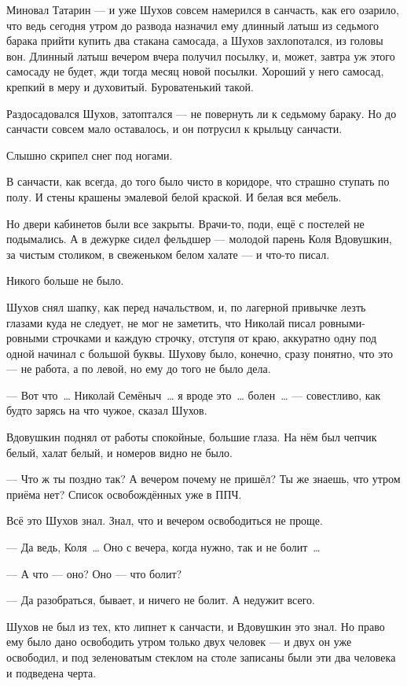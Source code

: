 Миновал Татарин --- и уже Шухов совсем намерился в санчасть, как его озарило, что ведь сегодня 
утром до развода назначил ему длинный латыш из седьмого барака прийти купить два стакана 
самосада, а Шухов захлопотался, из головы вон. Длинный латыш вечером вчера получил посылку, 
и, может, завтра уж этого самосаду не будет, жди тогда месяц новой посылки. Хороший у него 
самосад, крепкий в меру и духовитый. Буроватенький такой.

Раздосадовался Шухов, затоптался --- не повернуть ли к седьмому бараку. Но до санчасти совсем 
мало оставалось, и он потрусил к крыльцу санчасти.

Слышно скрипел снег под ногами.

В санчасти, как всегда, до того было чисто в коридоре, что страшно ступать по полу. И стены 
крашены эмалевой белой краской. И белая вся мебель.

Но двери кабинетов были все закрыты. Врачи-то, поди, ещё с постелей не подымались. А в дежурке 
сидел фельдшер --- молодой парень Коля Вдовушкин, за чистым столиком, в свеженьком белом 
халате --- и что-то писал.

Никого больше не было.

Шухов снял шапку, как перед начальством, и, по лагерной привычке лезть глазами куда не 
следует, не мог не заметить, что Николай писал ровными-ровными строчками и каждую строчку, 
отступя от краю, аккуратно одну под одной начинал с большой буквы. Шухову было, конечно, 
сразу понятно, что это --- не работа, а по левой, но ему до того не было дела.

--- Вот что~\dots{} Николай Семёныч~\dots{} я вроде это~\dots{} болен~\dots{} --- совестливо, как будто зарясь 
на что чужое, сказал Шухов.

Вдовушкин поднял от работы спокойные, большие глаза. На нём был чепчик белый, халат белый, и 
номеров видно не было.

--- Что ж ты поздно так? А вечером почему не пришёл? Ты же знаешь, что утром приёма нет? Список 
освобождённых уже в ППЧ.

Всё это Шухов знал. Знал, что и вечером освободиться не проще.

--- Да ведь, Коля~\dots{} Оно с вечера, когда нужно, так и не болит~\dots{}

--- А что --- оно? Оно --- что болит?

--- Да разобраться, бывает, и ничего не болит. А недужит всего.

Шухов не был из тех, кто липнет к санчасти, и Вдовушкин это знал. Но право ему было дано 
освободить утром только двух человек --- и двух он уже освободил, и под зеленоватым стеклом на 
столе записаны были эти два человека и подведена черта.

